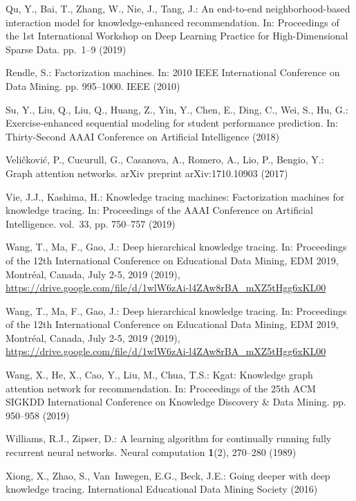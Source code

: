 \documentclass[runningheads]{llncs}
\begin{document}
\begin{thebibliography}{10}
	Qu, Y., Bai, T., Zhang, W., Nie, J., Tang, J.: An end-to-end neighborhood-based
	interaction model for knowledge-enhanced recommendation. In: Proceedings of
	the 1st International Workshop on Deep Learning Practice for High-Dimensional
	Sparse Data. pp.~1--9 (2019)
	
	Rendle, S.: Factorization machines. In: 2010 IEEE International Conference on
	Data Mining. pp. 995--1000. IEEE (2010)
	
	Su, Y., Liu, Q., Liu, Q., Huang, Z., Yin, Y., Chen, E., Ding, C., Wei, S., Hu,
	G.: Exercise-enhanced sequential modeling for student performance prediction.
	In: Thirty-Second AAAI Conference on Artificial Intelligence (2018)
	
	Veli{\v{c}}kovi{\'c}, P., Cucurull, G., Casanova, A., Romero, A., Lio, P.,
	Bengio, Y.: Graph attention networks. arXiv preprint arXiv:1710.10903  (2017)
	
	Vie, J.J., Kashima, H.: Knowledge tracing machines: Factorization machines for
	knowledge tracing. In: Proceedings of the AAAI Conference on Artificial
	Intelligence. vol.~33, pp. 750--757 (2019)
	
	Wang, T., Ma, F., Gao, J.: Deep hierarchical knowledge tracing. In: Proceedings
	of the 12th International Conference on Educational Data Mining, {EDM} 2019,
	Montr{\'{e}}al, Canada, July 2-5, 2019 (2019),
	\url{https://drive.google.com/file/d/1wlW6zAi-l4ZAw8rBA\_mXZ5tHgg6xKL00}
	
	Wang, T., Ma, F., Gao, J.: Deep hierarchical knowledge tracing. In: Proceedings
	of the 12th International Conference on Educational Data Mining, {EDM} 2019,
	Montr{\'{e}}al, Canada, July 2-5, 2019 (2019),
	\url{https://drive.google.com/file/d/1wlW6zAi-l4ZAw8rBA\_mXZ5tHgg6xKL00}
	
	Wang, X., He, X., Cao, Y., Liu, M., Chua, T.S.: Kgat: Knowledge graph attention
	network for recommendation. In: Proceedings of the 25th ACM SIGKDD
	International Conference on Knowledge Discovery \& Data Mining. pp. 950--958
	(2019)
	
	Williams, R.J., Zipser, D.: A learning algorithm for continually running fully
	recurrent neural networks. Neural computation  \textbf{1}(2),  270--280
	(1989)
	
	Xiong, X., Zhao, S., Van~Inwegen, E.G., Beck, J.E.: Going deeper with deep
	knowledge tracing. International Educational Data Mining Society  (2016)
	

\end{thebibliography}
\end{document}
